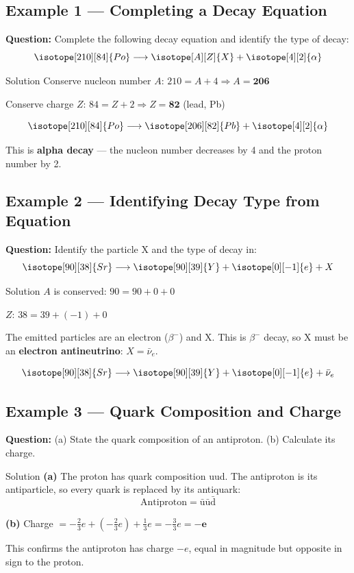 \subsection*{Example 1 — Completing a Decay Equation}

\textbf{Question:} Complete the following decay equation and identify the type of decay:
$$\isotope[210][84]{Po} \longrightarrow \isotope[A][Z]{X} + \isotope[4][2]{\alpha}$$

\begin{examplebox}{Solution}
Conserve nucleon number $A$: \quad $210 = A + 4 \Rightarrow A = \mathbf{206}$

Conserve charge $Z$: \quad $84 = Z + 2 \Rightarrow Z = \mathbf{82}$ (lead, Pb)

$$\isotope[210][84]{Po} \longrightarrow \isotope[206][82]{Pb} + \isotope[4][2]{\alpha}$$

This is \textbf{alpha decay} — the nucleon number decreases by 4 and the proton number by 2.
\end{examplebox}

\subsection*{Example 2 — Identifying Decay Type from Equation}

\textbf{Question:} Identify the particle X and the type of decay in:
$$\isotope[90][38]{Sr} \longrightarrow \isotope[90][39]{Y} + \isotope[0][-1]{e} + X$$

\begin{examplebox}{Solution}
$A$ is conserved: $90 = 90 + 0 + 0$ \checkmark

$Z$: $38 = 39 + (-1) + 0$ \checkmark

The emitted particles are an electron ($\beta^-$) and X. This is $\beta^-$ decay, so X must be an \textbf{electron antineutrino}: $X = \bar{\nu}_e$.

$$\isotope[90][38]{Sr} \longrightarrow \isotope[90][39]{Y} + \isotope[0][-1]{e} + \bar{\nu}_e$$
\end{examplebox}

\subsection*{Example 3 — Quark Composition and Charge}

\textbf{Question:} (a) State the quark composition of an antiproton. (b) Calculate its charge.

\begin{examplebox}{Solution}
\textbf{(a)} The proton has quark composition uud. The antiproton is its antiparticle, so every quark is replaced by its antiquark:
$$\text{Antiproton} = \bar{\text{u}}\bar{\text{u}}\bar{\text{d}}$$

\textbf{(b)} Charge $= -\tfrac{2}{3}e + (-\tfrac{2}{3}e) + \tfrac{1}{3}e = -\tfrac{3}{3}e = \mathbf{-e}$

This confirms the antiproton has charge $-e$, equal in magnitude but opposite in sign to the proton.
\end{examplebox}

